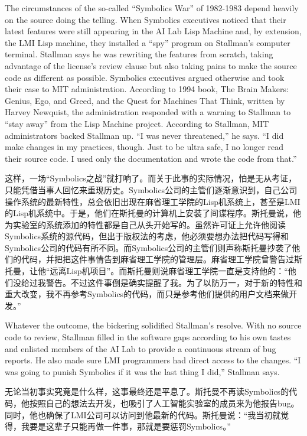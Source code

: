 \ifdefined\vone
\ifdefined\eng
The circumstances of the so-called ``Symbolics War'' of 1982-1983 depend heavily on the source doing the telling. When Symbolics executives noticed that their latest features were still appearing in the AI Lab Lisp Machine and, by extension, the LMI Lisp machine, they installed a ``spy'' program on Stallman's computer terminal. Stallman says he was rewriting the features from scratch, taking advantage of the license's review clause but also taking pains to make the source code as different as possible. Symbolics executives argued otherwise and took their case to MIT administration. According to 1994 book, The Brain Makers: Genius, Ego, and Greed, and the Quest for Machines That Think, written by Harvey Newquist, the administration responded with a warning to Stallman to ``stay away'' from the Lisp Machine project. According to Stallman, MIT administrators backed Stallman up. ``I was never threatened,'' he says. ``I did make changes in my practices, though. Just to be ultra safe, I no longer read their source code. I used only the documentation and wrote the code from that.''
\fi

\ifdefined\chs
这样，一场``Symbolics之战''就打响了。而关于此事的实际情况，怕是无从考证，只能凭借当事人回忆来重现历史。Symbolics公司的主管们逐渐意识到，自己公司操作系统的最新特性，总会依旧出现在麻省理工学院的Lisp机系统上，甚至是LMI的Lisp机系统中。于是，他们在斯托曼的计算机上安装了间谍程序。斯托曼说，他为实验室的系统添加的特性都是自己从头开始写的。虽然许可证上允许他阅读Symbolics系统的源代码，但出于版权法的考虑，他必须要想办法把代码写得和Symbolics公司的代码有所不同。而Symbolics公司的主管们则声称斯托曼抄袭了他们的代码，并把把这件事情告到麻省理工学院的管理层。麻省理工学院曾警告过斯托曼，让他``远离Lisp机项目''。而斯托曼则说麻省理工学院一直是支持他的：``他们没给过我警告。不过这件事倒是确实提醒了我。为了以防万一，对于新的特性和重大改变，我不再参考Symbolics的代码，而只是参考他们提供的用户文档来做开发。''
\fi

\ifdefined\eng
Whatever the outcome, the bickering solidified Stallman's resolve. With no source code to review, Stallman filled in the software gaps according to his own tastes and enlisted members of the AI Lab to provide a continuous stream of bug reports. He also made sure LMI programmers had direct access to the changes. ``I was going to punish Symbolics if it was the last thing I did,'' Stallman says.
\fi

\ifdefined\chs
无论当初事实究竟是什么样，这事最终还是平息了。斯托曼不再读Symbolics的代码，他按照自己的想法去开发，也吸引了人工智能实验室的成员来为他报告bug。同时，他也确保了LMI公司可以访问到他最新的代码。斯托曼说：``我当初就觉得，我要是这辈子只能再做一件事，那就是要惩罚Symbolics。''
\fi

